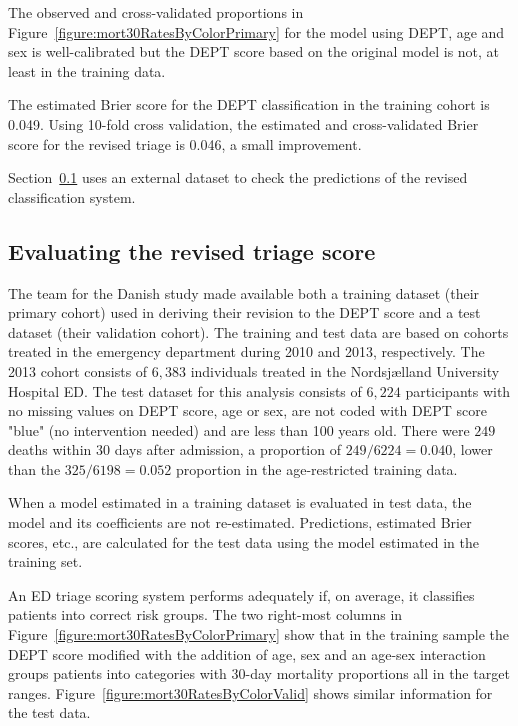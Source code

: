 The observed and cross-validated proportions in Figure~\ref{figure:mort30RatesByColorPrimary} for the model using DEPT, age and sex is well-calibrated but the DEPT score based on the original model is not, at least in the training data.

The estimated Brier score for the DEPT classification in the training cohort is 0.049. Using 10-fold cross validation, the estimated and cross-validated Brier score for the revised triage is 0.046, a small improvement.

Section~\ref{section:validationRevisedTriageScore} uses an external dataset to check the predictions of the revised classification system.

\subsection{Evaluating the revised triage score}
\label{section:validationRevisedTriageScore}

The team for the Danish study made available both a training dataset (their primary cohort) used in deriving their revision to the DEPT score and a test dataset (their validation cohort).  The training and test data are based on cohorts treated in the emergency department during 2010 and 2013, respectively.  The 2013 cohort consists of $6,383$ individuals treated in the Nordsj{\ae}lland University Hospital ED.  The test dataset for this analysis consists of $6,224$ participants with no missing values on DEPT score, age or sex, are not coded with DEPT score "blue" (no intervention needed) and are less than 100 years old.   There were $249$ deaths within 30 days after admission, a proportion of $249/6224 = 0.040$, lower than the $325/6198 = 0.052$ proportion in the age-restricted training data. 

When a model estimated in a training dataset is evaluated in test data, the model and its coefficients are not re-estimated.  Predictions, estimated Brier scores, etc., are  calculated for the test data using the model estimated in the training set.  

An ED triage scoring system performs adequately if, on average, it classifies patients into correct risk groups.  The two right-most columns in Figure~\ref{figure:mort30RatesByColorPrimary}  show that in the training sample the DEPT score modified with the addition of age, sex and an age-sex interaction groups patients into categories with 30-day mortality proportions all in the target ranges.  Figure~\ref{figure:mort30RatesByColorValid} shows similar information for the test data.

